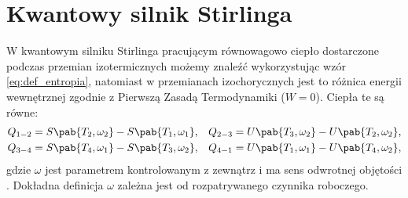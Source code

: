 
\section{Kwantowy silnik Stirlinga}
W kwantowym silniku Stirlinga pracującym równowagowo ciepło dostarczone podczas przemian izotermicznych możemy znaleźć wykorzystując wzór \eqref{eq:def_entropia}, natomiast w przemianach izochorycznych jest to różnica energii wewnętrznej zgodnie z Pierwszą Zasadą Termodynamiki (\(W=0\)). Ciepła te są równe:
\begin{align*}
	Q_{1-2} &= S\pab{T_2,\omega_2} - S\pab{T_1,\omega_1}, &
	Q_{2-3} &= U\pab{T_3,\omega_2} - U\pab{T_2,\omega_2}, \\
	Q_{3-4} &= S\pab{T_4,\omega_1} - S\pab{T_3,\omega_2}, &
	Q_{4-1} &= U\pab{T_1,\omega_1} - U\pab{T_4,\omega_2},
\end{align*}
gdzie \(\omega\) jest parametrem kontrolowanym z zewnątrz i ma sens odwrotnej objętości \cite{myers}. Dokładna definicja \(\omega\) zależna jest od rozpatrywanego czynnika roboczego.


